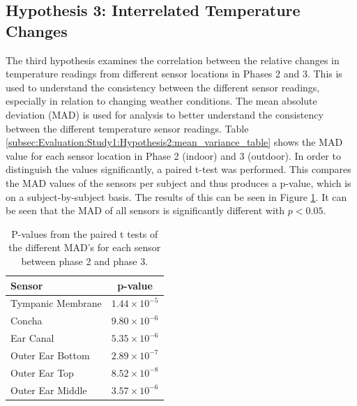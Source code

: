 \subsection{Hypothesis 3: Interrelated Temperature Changes}
\label{subsec:Evaluation:Study1:Hypothesis3}
The third hypothesis examines the correlation between the relative changes in temperature readings from different sensor locations in Phases 2 and 3.
This is used to understand the consistency between the different sensor readings, especially in relation to changing weather conditions.
The mean absolute deviation (MAD) is used for analysis to better understand the consistency between the different temperature sensor readings. 
Table \ref{subsec:Evaluation:Study1:Hypothesis2:mean_variance_table} shows the MAD value for each sensor location in Phase 2 (indoor) and 3 (outdoor).
In order to distinguish the values significantly, a paired t-test was performed. 
This compares the MAD values of the sensors per subject and thus produces a p-value, which is on a subject-by-subject basis.
The results of this can be seen in Figure \ref{subsec:Evaluation:Study1:Hypothesis3:pvalues}.
It can be seen that the MAD of all sensors is significantly different with $p<0.05$.
\begin{table}[!t]
\centering
\begin{tabularx}{\textwidth}{|X|c|}
\hline
\textbf{Sensor} & \textbf{p-value} \\
\hline
Tympanic Membrane & \(1.44 \times 10^{-5}\) \\
Concha & \(9.80 \times 10^{-6}\) \\
Ear Canal & \(5.35 \times 10^{-6}\) \\
Outer Ear Bottom & \(2.89 \times 10^{-7}\) \\
Outer Ear Top & \(8.52 \times 10^{-8}\) \\
Outer Ear Middle & \(3.57 \times 10^{-6}\) \\
\hline
\end{tabularx}
\caption{P-values from the paired t tests of the different MAD's for each sensor between phase 2 and phase 3.}
\label{subsec:Evaluation:Study1:Hypothesis3:pvalues}
\end{table}

